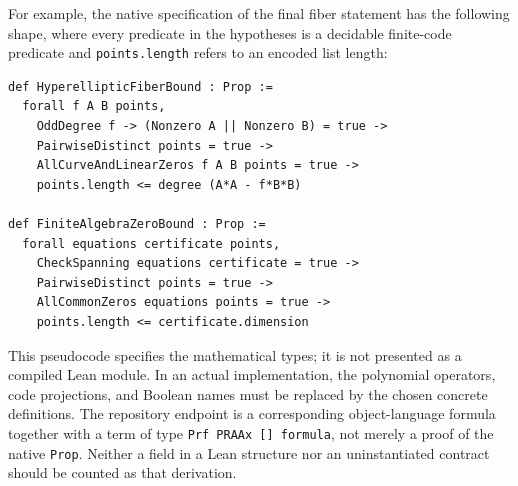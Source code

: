 For example, the native specification of the final fiber statement has
the following shape, where every predicate in the hypotheses is a
decidable finite-code predicate and \texttt{points.length} refers to an
encoded list length:
\begin{verbatim}
def HyperellipticFiberBound : Prop :=
  forall f A B points,
    OddDegree f -> (Nonzero A || Nonzero B) = true ->
    PairwiseDistinct points = true ->
    AllCurveAndLinearZeros f A B points = true ->
    points.length <= degree (A*A - f*B*B)

def FiniteAlgebraZeroBound : Prop :=
  forall equations certificate points,
    CheckSpanning equations certificate = true ->
    PairwiseDistinct points = true ->
    AllCommonZeros equations points = true ->
    points.length <= certificate.dimension
\end{verbatim}
This pseudocode specifies the mathematical types; it is not presented as
a compiled Lean module.  In an actual implementation, the polynomial
operators, code projections, and Boolean names must be replaced by the
chosen concrete definitions.  The repository endpoint is a corresponding
object-language formula together with a term of type
\texttt{Prf PRAAx [] formula}, not merely a proof of the native
\texttt{Prop}.  Neither a field in a Lean structure nor an uninstantiated
contract should be counted as that derivation.

